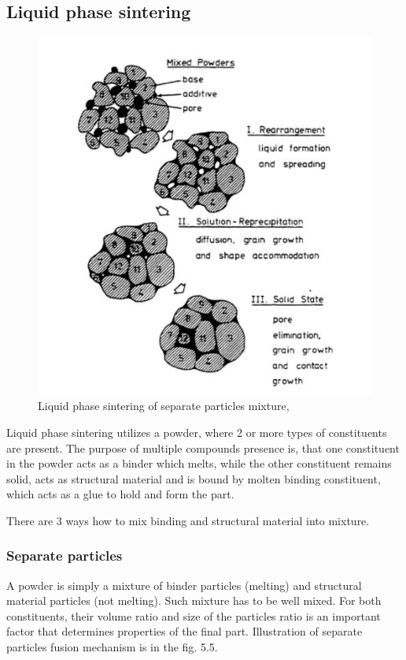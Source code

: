 \documentclass[a4paper, 11pt, reqno]{report}
\begin{document}
\subsection{Liquid phase sintering}
\begin{figure}[b!]
	\centering
 	\includegraphics[scale=0.7]{liquidPhaseSintering}
	\caption{Liquid phase sintering of separate particles mixture, \cite[p. 6]{LPS}}
\end{figure}
Liquid phase sintering utilizes a powder, where 2 or more types of constituents are present. The purpose of multiple compounds presence is, that one constituent in the powder acts as a binder which melts, while the other constituent remains solid, acts as structural material  and is bound by molten binding constituent, which acts as a glue to hold and form the part.

	There are 3 ways how to mix binding and structural material into mixture.
	
\subsubsection{Separate particles}
A powder is simply a mixture of binder particles (melting) and structural material particles (not melting). Such mixture has to be well mixed. For both constituents, their volume ratio and size of the particles ratio is an important factor that determines properties of the final part. Illustration of separate particles fusion mechanism is in the fig. 5.5.
\end{document}
